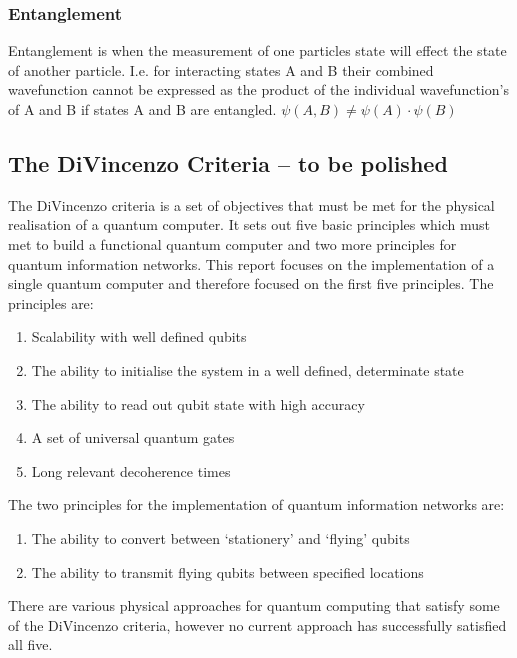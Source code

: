 \subsubsection{Entanglement}
Entanglement is when the measurement of one particles state will effect the state of another particle.
I.e. for interacting states A and B their combined wavefunction cannot be expressed as the product of the individual wavefunction's of A and B if states A and B are entangled. \cite{bransden_quantum_2000}
$\psi(A,B)\neq \psi(A)\cdot \psi(B)$ 



\subsection{The DiVincenzo Criteria -- to be polished}
The DiVincenzo criteria is a set of objectives that must be met for the physical realisation of a quantum computer. 
It sets out five basic principles which must met to build a functional quantum computer and two more principles for quantum information networks. \cite{bergou_quantum_2021}
This report focuses on the implementation of a single quantum computer and therefore focused on the first five principles.
The principles are:
\begin{enumerate}
    \item Scalability with well defined qubits
    \item The ability to initialise the system in a well defined, determinate state
    \item The ability to read out qubit state with high accuracy
    \item A set of universal quantum gates
    \item Long relevant decoherence times
    \setcounter{enumTemp}{\theenumi}
\end{enumerate}
The two principles for the implementation of quantum information networks are:
\begin{enumerate}
    \setcounter{enumi}{\theenumTemp}
    \item The ability to convert between `stationery' and `flying' qubits
    \item The ability to transmit flying qubits between specified locations
\end{enumerate}

There are various physical approaches for quantum computing that satisfy some of the DiVincenzo criteria, however no current approach has successfully satisfied all five.
\vspace{1em}

